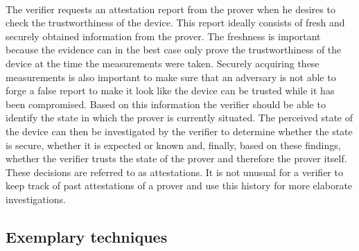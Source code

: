 \paragraph*{}
The verifier requests an attestation report from the prover when he desires to check the trustworthiness of the device. This report ideally consists of fresh and securely obtained information from the prover. The freshness is important because the evidence can in the best case only prove the trustworthiness of the device at the time the measurements were taken. Securely acquiring these measurements is also important to make sure that an adversary is not able to forge a false report to make it look like the device can be trusted while it has been compromised. Based on this information the verifier should be able to identify the state in which the prover is currently situated. The perceived state of the device can then be investigated by the verifier to determine whether the state is secure, whether it is expected or known and, finally, based on these findings, whether the verifier trusts the state of the prover and therefore the prover itself. These decisions are referred to as attestations. It is not unusual for a verifier to keep track of past attestations of a prover and use this history for more elaborate investigations.

\subsection*{Exemplary techniques}

